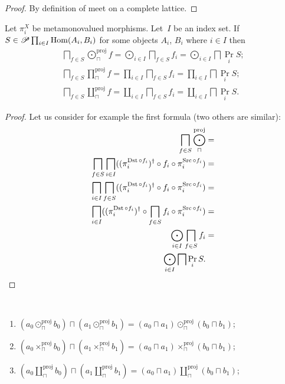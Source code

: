 \begin{proof}
  By definition of meet on a complete lattice.
\end{proof}

\begin{thm}
  Let $\pi^X_i$ be metamonovalued morphisms. Let~$I$ be an index set. If $S \in \mathscr{P} \prod_{i\in I}\operatorname{Hom}(A_i, B_i)$ for some objects $A_i$, $B_i$ where $i\in I$ then
  \begin{gather*}
    \bigsqcap_{f\in S} \bigodot^{\operatorname{proj}}_{\sqcap}f =
    \bigodot_{i\in I}\bigsqcap_{f\in S}f_i=
    \bigodot_{i\in I}\bigsqcap\Pr_i S;\\
    \bigsqcap_{f\in S} \prod^{\operatorname{proj}}_{\sqcap} f =
    \prod_{i\in I}\bigsqcap_{f\in S}f_i=
    \prod_{i\in I}\bigsqcap\Pr_i S;\\
    \bigsqcap_{f\in S} \coprod^{\operatorname{proj}}_{\sqcap} f =
    \coprod_{i\in I}\bigsqcap_{f\in S}f_i=
    \coprod_{i\in I}\bigsqcap\Pr_i S.
  \end{gather*}
\end{thm}

\begin{proof}
Let us consider for example the first formula (two others
are similar):
  \begin{align*}
  \bigsqcap_{f\in S} \bigodot^{\operatorname{proj}}_{\sqcap} & = \\
  \bigsqcap_{f\in S} \bigsqcap_{i\in I}((\pi^{\operatorname{Dst}\circ f_i}_i)^{\dagger} \circ f_i \circ \pi^{\operatorname{Src}\circ f_i}_i) & = \\
  \bigsqcap_{i\in I}\bigsqcap_{f\in S}((\pi^{\operatorname{Dst}\circ f_i}_i)^{\dagger} \circ f_i \circ \pi^{\operatorname{Src}\circ f_i}_i) & = \\
  \bigsqcap_{i\in I}((\pi^{\operatorname{Dst}\circ f_i}_i)^{\dagger} \circ \bigsqcap_{f\in S}f_i \circ \pi^{\operatorname{Src}\circ f_i}_i) & = \\
  \bigodot_{i\in I}\bigsqcap_{f\in S}f_i & = \\
  \bigodot_{i\in I}\bigsqcap\Pr_i S.
  \end{align*}
\end{proof}

\begin{cor}
~
\begin{enumerate}
\item
  $(a_0 \odot^{\operatorname{proj}}_{\sqcap} b_0) \sqcap (a_1 \odot^{\operatorname{proj}}_{\sqcap} b_1) = (a_0 \sqcap a_1)
  \odot^{\operatorname{proj}}_{\sqcap} (b_0 \sqcap b_1)$;
\item
  $(a_0 \times^{\operatorname{proj}}_{\sqcap} b_0) \sqcap (a_1 \times^{\operatorname{proj}}_{\sqcap} b_1) = (a_0 \sqcap a_1)
\times^{\operatorname{proj}}_{\sqcap} (b_0 \sqcap b_1)$;
\item
  $(a_0 \amalg^{\operatorname{proj}}_{\sqcap} b_0) \sqcap (a_1 \amalg^{\operatorname{proj}}_{\sqcap} b_1) = (a_0 \sqcap a_1)
  \amalg^{\operatorname{proj}}_{\sqcap} (b_0 \sqcap b_1)$;
\end{enumerate}
\end{cor}

